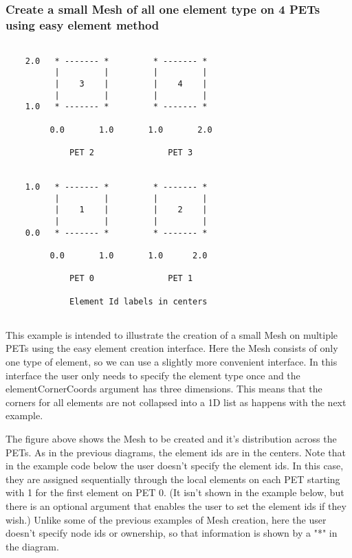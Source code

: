 
  \subsubsection{Create a small Mesh of all one element type on 4 PETs using easy element method}
  \label{sec:mesh:4pet1stepee1type}
  \begin{minipage}{\linewidth} 
  \begin{verbatim}
  
    2.0   * ------- *         * ------- *          
          |         |         |         |
          |    3    |         |    4    |
          |         |         |         |
    1.0   * ------- *         * ------- *
          
         0.0       1.0       1.0       2.0
  
             PET 2               PET 3
  
  
    1.0   * ------- *         * ------- *
          |         |         |         |
          |    1    |         |    2    |
          |         |         |         |
    0.0   * ------- *         * ------- *
  
         0.0       1.0       1.0      2.0 
   
             PET 0               PET 1
  
             Element Id labels in centers
  
  \end{verbatim}
  \end{minipage}
   
   This example is intended to illustrate the creation of a small Mesh on multiple PETs using the easy element creation interface. 
   Here the Mesh consists of only one type of element, so we can use a slightly more convenient interface. In this interface the user
   only needs to specify the element type once and the elementCornerCoords argument has three dimensions. This means that the corners for all
   elements are not collapsed into a 1D list as happens with the next example. 
   
   The figure above shows the Mesh to be created and it's distribution across the PETs. As in the previous diagrams, the element ids are in the centers. 
   Note that in the example code below the user doesn't specify the element ids. In this case, they are assigned sequentially
   through the local elements on each PET starting with 1 for the first element on PET 0. (It isn't shown in the example below, but there is
   an optional argument that enables the user to set the element ids if they wish.) 
   Unlike some of the previous examples of Mesh creation, here the user doesn't specify node ids or ownership, so that information is shown by a "*" in 
   the diagram. 
   
